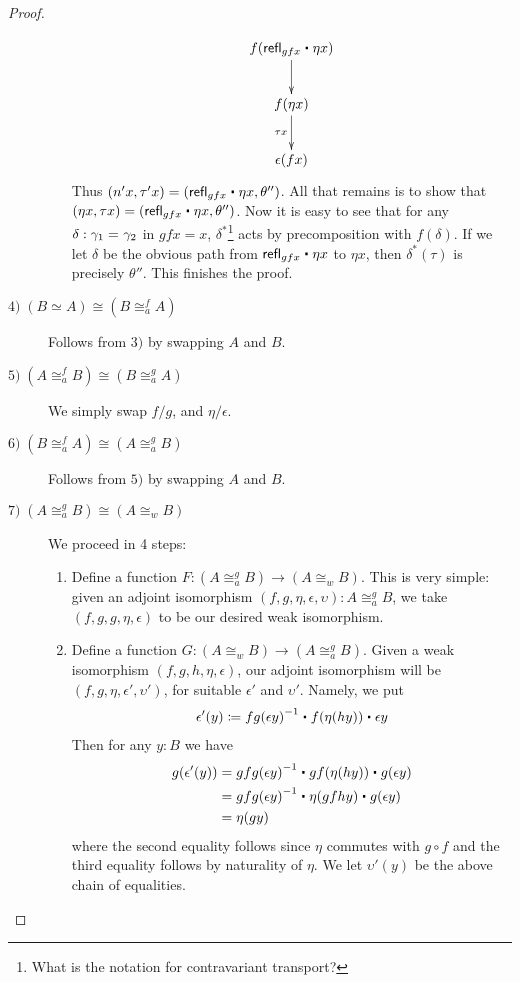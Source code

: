 \begin{proof}
\begin{description}
\begin{enumerate}
\begin{align*}
\xymatrix{
f(\refl{gfx} \ct \eta x) \ar[d] \\
f(\eta x) \ar[d] _{\tau x} \\
\epsilon (f x)}
\end{align*}
Thus $(n'x,\tau' x) = (\refl{gfx} \ct \eta x, \theta'')$. All that remains is to show that $(\eta x, \tau x) = (\refl{gfx} \ct \eta x, \theta'')$. Now it is easy to see that for any $\delta : \gamma_1 =_{} \gamma_2$ in $gfx = x$, $\delta^*$\footnote{What is the notation for contravariant transport?} acts by precomposition with $f(\delta)$. If we let $\delta$ be the obvious path from $\refl{gfx} \ct \eta x$ to $\eta x$, then $\delta^*(\tau)$ is precisely $\theta''$. This finishes the proof.
\end{enumerate}

\item[$\mathit{4)} \; (B \simeq A) \cong (B \cong^f_a A)$] Follows from $\mathit{3)}$ by swapping $A$ and $B$.

\item[$\mathit{5)} \; (A \cong^f_a B) \cong (B \cong^g_a A)$] We simply swap $f/g$, and $\eta/\epsilon$.

\item[$\mathit{6)} \; (B \cong^f_a A) \cong (A \cong^g_a B)$] Follows from $\mathit{5)}$ by swapping $A$ and $B$.

\item[$\mathit{7)} \; (A \cong^g_a B) \cong  (A \cong_w B)$] We proceed in 4 steps:
\begin{enumerate}
\item Define a function $F : (A \cong^g_a B) \to (A \cong_w B)$. This is very simple: given an adjoint isomorphism $(f,g,\eta,\epsilon,\upsilon) : A \cong^g_a B$, 
we take $(f,g,g,\eta,\epsilon)$ to be our desired weak isomorphism. \\



\item Define a function $G : (A \cong_w B) \to (A \cong^g_a B)$. Given a weak isomorphism $(f,g,h,\eta,\epsilon)$, our adjoint isomorphism will be $(f,g,\eta,\epsilon',\upsilon')$, for suitable $\epsilon'$ and $\upsilon'$. 
Namely, we put
\begin{align*}
\epsilon'(y) \defeq \opp{fg(\epsilon y)} \ct f(\eta (h y)) \ct \epsilon y
\end{align*}
Then for any $y : B$ we have
\begin{align*}
g(\epsilon'(y)) & = \opp{gfg(\epsilon y)} \ct gf(\eta (h y)) \ct g(\epsilon y) \\
& = \opp{gfg(\epsilon y)} \ct \eta (gfhy) \ct g(\epsilon y) \\
& = \eta(gy)
\end{align*}
where the second equality follows since $\eta$ commutes with $g \circ f$ and the third equality follows by naturality of $\eta$. We let $\upsilon'(y)$ be the above chain of equalities. \\




\end{enumerate}
\end{description}
\end{proof}
